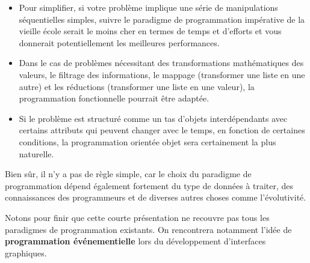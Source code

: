 \documentclass[
  a4paper,
  DIV=11,
  numbers=noendperiod]{scrartcl}
\providecommand{\tightlist}{%
  \setlength{\itemsep}{0pt}\setlength{\parskip}{0pt}}\usepackage{longtable,booktabs,array}
\begin{document}
\begin{itemize}
\tightlist
\item
  Pour simplifier, si votre problème implique une série de manipulations
  séquentielles simples, suivre le paradigme de programmation impérative
  de la vieille école serait le moins cher en termes de temps et
  d'efforts et vous donnerait potentiellement les meilleures
  performances.
\item
  Dans le cas de problèmes nécessitant des transformations mathématiques
  des valeurs, le filtrage des informations, le mappage (transformer une
  liste en une autre) et les réductions (transformer une liste en une
  valeur), la programmation fonctionnelle pourrait être adaptée.
\item
  Si le problème est structuré comme un tas d'objets interdépendants
  avec certains attributs qui peuvent changer avec le temps, en fonction
  de certaines conditions, la programmation orientée objet sera
  certainement la plus naturelle.
\end{itemize}

Bien sûr, il n'y a pas de règle simple, car le choix du paradigme de
programmation dépend également fortement du type de données à traiter,
des connaissances des programmeurs et de diverses autres choses comme
l'évolutivité.

Notons pour finir que cette courte présentation ne recouvre pas tous les
paradigmes de programmation existants. On rencontrera notamment l'idée
de \textbf{programmation événementielle} lors du développement
d'interfaces graphiques.
\end{document}
